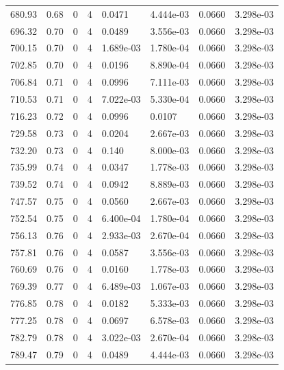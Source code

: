 \documentclass[preview]{standalone}
\begin{document}
{{{{{\begin{tabular}{L{1.2cm}C{1.2cm} C{0.3cm}C{0.5cm} C{1.4cm}C{1.4cm} C{1.4cm}C{1.4cm}}
  680.93  &  0.68  & 0     &  4 &  0.0471  & 4.444e-03  & 0.0660 &  3.298e-03   \\ 
  696.32  &  0.70  & 0     &  4 &  0.0489  & 3.556e-03  & 0.0660 &  3.298e-03   \\ 
  700.15  &  0.70  & 0     &  4 &  1.689e-03  & 1.780e-04  & 0.0660 &  3.298e-03   \\ 
  702.85  &  0.70  & 0     &  4 &  0.0196  & 8.890e-04  & 0.0660 &  3.298e-03   \\ 
  706.84  &  0.71  & 0     &  4 &  0.0996  & 7.111e-03  & 0.0660 &  3.298e-03   \\ 
  710.53  &  0.71  & 0     &  4 &  7.022e-03  & 5.330e-04  & 0.0660 &  3.298e-03   \\ 
  716.23  &  0.72  & 0     &  4 &  0.0996  & 0.0107  & 0.0660 &  3.298e-03   \\ 
  729.58  &  0.73  & 0     &  4 &  0.0204  & 2.667e-03  & 0.0660 &  3.298e-03   \\ 
  732.20  &  0.73  & 0     &  4 &  0.140  & 8.000e-03  & 0.0660 &  3.298e-03   \\ 
  735.99  &  0.74  & 0     &  4 &  0.0347  & 1.778e-03  & 0.0660 &  3.298e-03   \\ 
  739.52  &  0.74  & 0     &  4 &  0.0942  & 8.889e-03  & 0.0660 &  3.298e-03   \\ 
  747.57  &  0.75  & 0     &  4 &  0.0560  & 2.667e-03  & 0.0660 &  3.298e-03   \\ 
  752.54  &  0.75  & 0     &  4 &  6.400e-04  & 1.780e-04  & 0.0660 &  3.298e-03   \\ 
  756.13  &  0.76  & 0     &  4 &  2.933e-03  & 2.670e-04  & 0.0660 &  3.298e-03   \\ 
  757.81  &  0.76  & 0     &  4 &  0.0587  & 3.556e-03  & 0.0660 &  3.298e-03   \\ 
  760.69  &  0.76  & 0     &  4 &  0.0160  & 1.778e-03  & 0.0660 &  3.298e-03   \\ 
  769.39  &  0.77  & 0     &  4 &  6.489e-03  & 1.067e-03  & 0.0660 &  3.298e-03   \\ 
  776.85  &  0.78  & 0     &  4 &  0.0182  & 5.333e-03  & 0.0660 &  3.298e-03   \\ 
  777.25  &  0.78  & 0     &  4 &  0.0697  & 6.578e-03  & 0.0660 &  3.298e-03   \\ 
  782.79  &  0.78  & 0     &  4 &  3.022e-03  & 2.670e-04  & 0.0660 &  3.298e-03   \\ 
  789.47  &  0.79  & 0     &  4 &  0.0489  & 4.444e-03  & 0.0660 &  3.298e-03   \\ 

\end{tabular}}}}}}
\end{document}
